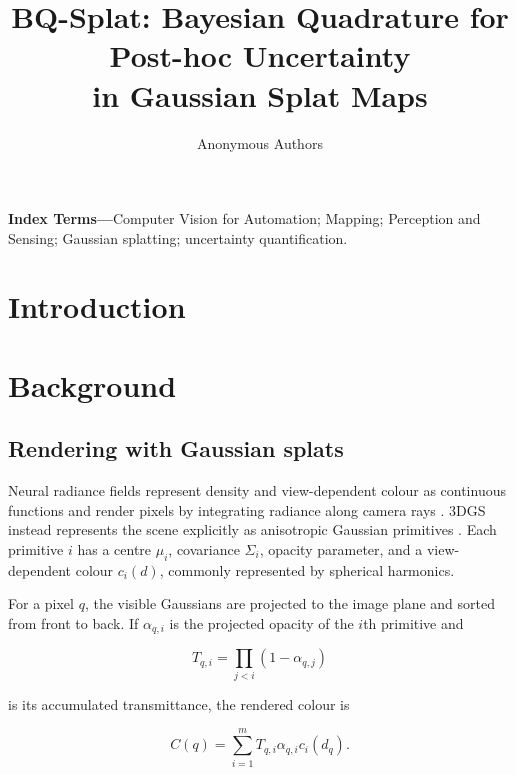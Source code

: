 \documentclass[letterpaper,10pt,conference]{ieeeconf}
\title{BQ-Splat: Bayesian Quadrature for Post-hoc Uncertainty\\in Gaussian Splat Maps}
\author{Anonymous Authors}
\begin{document}
\maketitle
\thispagestyle{empty}
\pagestyle{empty}

\begin{abstract}

\end{abstract}

\begin{center}
\small\textbf{Index Terms---}Computer Vision for Automation; Mapping;
Perception and Sensing; Gaussian splatting; uncertainty quantification.
\end{center}

\section{Introduction}


\section{Background}

\subsection{Rendering with Gaussian splats}
\label{sec:rendering-with-splats}

Neural radiance fields represent density and view-dependent colour as
continuous functions and render pixels by integrating radiance along camera
rays \cite{mildenhall2020}. 3DGS instead represents the scene explicitly as
anisotropic Gaussian primitives \cite{kerbl2023}. Each primitive $i$ has a
centre $\mu_i$, covariance $\Sigma_i$, opacity parameter, and a
view-dependent colour $c_i(d)$, commonly represented by spherical harmonics.

For a pixel $q$, the visible Gaussians are projected to the image plane and
sorted from front to back. If $\alpha_{q,i}$ is the projected opacity of the
$i$th primitive and

\begin{equation}
    T_{q,i}=\prod_{j<i}(1-\alpha_{q,j})
\end{equation}

is its accumulated transmittance, the rendered colour is

\begin{equation}
    C(q)=\sum_{i=1}^{m} T_{q,i}\alpha_{q,i}c_i(d_q).
    \label{eq:alpha-compositing}
\end{equation}
\end{document}
